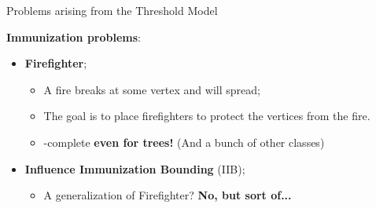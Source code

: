 \documentclass[10pt,aspectratio=169,english]{beamer}
\begin{document}
\begin{frame}{Problems arising from the Threshold Model}
	
	\textbf{Immunization problems}:
	
	\begin{itemize}
		\item<1-> \textbf{Firefighter};
		\begin{itemize}
			\item<2-> A fire breaks at some vertex and will spread;
			\item<3-> The goal is to place firefighters to protect the vertices from the fire.
			\item<6-> \NP-complete \textbf{even for trees!} (And a bunch of other classes)
		\end{itemize}
		\item<7-> \textbf{Influence Immunization Bounding} (\textsc{IIB});
		\begin{itemize}
			\item<7-> A generalization of Firefighter? \textbf{No, but sort of...}
		\end{itemize}
	\end{itemize}
	
	
	

\end{frame}
\end{document}
